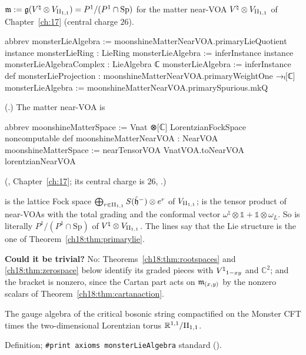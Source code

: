 \begin{definition}\label{ch18:def:monsterlie}
$\mathfrak{m}:=\mathfrak g({V^{\natural}}\otimes V_{\mathrm{II}_{1,1}})=P^1/(P^1\cap\mathrm{Sp})$ for the matter near-VOA
${V^{\natural}}\otimes V_{\mathrm{II}_{1,1}}$ of Chapter~\ref{ch:17} (central charge $26$).
\end{definition}
\begin{leancode}
abbrev monsterLieAlgebra := moonshineMatterNearVOA.primaryLieQuotient
instance monsterLieRing : LieRing monsterLieAlgebra := inferInstance
instance monsterLieAlgebraComplex : LieAlgebra ℂ monsterLieAlgebra := inferInstance
def monsterLieProjection : moonshineMatterNearVOA.primaryWeightOne →ₗ[ℂ] monsterLieAlgebra :=
  moonshineMatterNearVOA.primarySpurious.mkQ
\end{leancode}
(.)  The matter near-VOA is
\begin{leancode}
abbrev moonshineMatterSpace := Vnat ⊗[ℂ] LorentzianFockSpace
noncomputable def moonshineMatterNearVOA : NearVOA moonshineMatterSpace :=
  nearTensorVOA VnatVOA.toNearVOA lorentzianNearVOA
\end{leancode}
(, Chapter~\ref{ch:17}; its central charge is
$26$, .)
\begin{dictionary}
 is the lattice Fock space $\bigoplus_{r\in\mathrm{II}_{1,1}}S(\hat{\mathfrak h}^-)\otimes e^r$ of
$V_{\mathrm{II}_{1,1}}$;  is the tensor product of near-VOAs with the total grading and the conformal
vector $\omega^\natural\otimes\mathbb 1+\mathbb 1\otimes\omega_L$.  So  is literally $P^1/(P^1\cap\mathrm{Sp})$ of
${V^{\natural}}\otimes V_{\mathrm{II}_{1,1}}$.  The  lines say that the Lie structure is the one of
Theorem~\ref{ch18:thm:primarylie}.

\textbf{Could it be trivial?}  No: Theorems~\ref{ch18:thm:rootspaces} and \ref{ch18:thm:zerospace} below identify its
graded pieces with ${V^{\natural}}_{1-xy}$ and $\mathbb C^2$; and the bracket is nonzero, since the Cartan part acts on
$\mathfrak{m}_{(x,y)}$ by the nonzero scalars of Theorem~\ref{ch18:thm:cartanaction}.
\end{dictionary}
\begin{physics}
The gauge algebra of the critical bosonic string compactified on the Monster CFT times the
two-dimensional Lorentzian torus $\mathbb R^{1,1}/\mathrm{II}_{1,1}$.
\end{physics}
\begin{status}Definition; \texttt{\#print axioms monsterLieAlgebra} standard ().\end{status}

